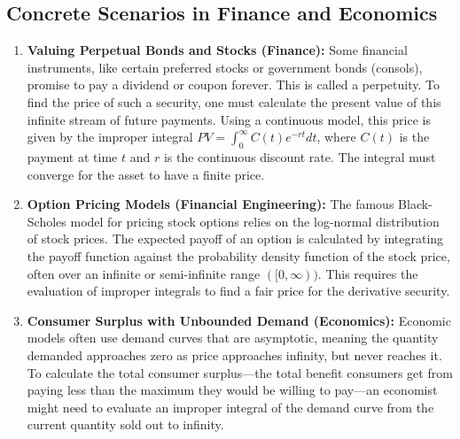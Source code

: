 \documentclass{article}
\begin{document}
\subsection{Concrete Scenarios in Finance and Economics}
\begin{enumerate}
    \item \textbf{Valuing Perpetual Bonds and Stocks (Finance):} Some financial instruments, like certain preferred stocks or government bonds (consols), promise to pay a dividend or coupon forever. This is called a perpetuity. To find the price of such a security, one must calculate the present value of this infinite stream of future payments. Using a continuous model, this price is given by the improper integral $PV = \int_0^\infty C(t)e^{-rt} dt$, where $C(t)$ is the payment at time $t$ and $r$ is the continuous discount rate. The integral must converge for the asset to have a finite price.

    \item \textbf{Option Pricing Models (Financial Engineering):} The famous Black-Scholes model for pricing stock options relies on the log-normal distribution of stock prices. The expected payoff of an option is calculated by integrating the payoff function against the probability density function of the stock price, often over an infinite or semi-infinite range $([0, \infty))$. This requires the evaluation of improper integrals to find a fair price for the derivative security.

    \item \textbf{Consumer Surplus with Unbounded Demand (Economics):} Economic models often use demand curves that are asymptotic, meaning the quantity demanded approaches zero as price approaches infinity, but never reaches it. To calculate the total consumer surplus—the total benefit consumers get from paying less than the maximum they would be willing to pay—an economist might need to evaluate an improper integral of the demand curve from the current quantity sold out to infinity.
\end{enumerate}
\end{document}
